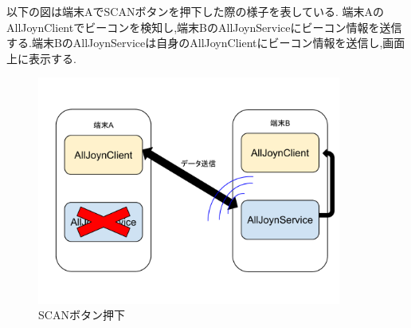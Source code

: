 以下の図は端末AでSCANボタンを押下した際の様子を表している.
端末AのAllJoynClientでビーコンを検知し,端末BのAllJoynServiceにビーコン情報を送信する.端末BのAllJoynServiceは自身のAllJoynClientにビーコン情報を送信し,画面上に表示する.

\begin{figure}[htbp]
\centering
\includegraphics[width=10cm]{fig/click_scan.pdf}
\caption{SCANボタン押下}
\end{figure}




